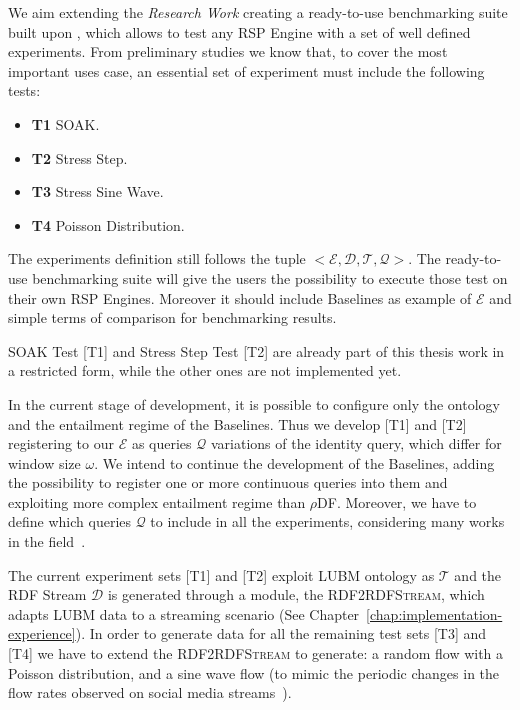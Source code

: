 \noindent We aim extending the \textit{Research Work} creating a ready-to-use benchmarking suite built upon \namens, which allows to test any RSP Engine with a set of well defined experiments. From preliminary studies we know that, to cover the most important uses case, an essential set of experiment must include the following tests:
\begin{itemize}
\item \textbf{T1} SOAK.
\item \textbf{T2} Stress Step.
\item \textbf{T3} Stress Sine Wave.
\item \textbf{T4} Poisson Distribution.
\end{itemize}

The experiments definition still follows the tuple $<\mathcal{E},\mathcal{D},\mathcal{T},\mathcal{Q}>$. The ready-to-use benchmarking suite will give the users the possibility to execute those test on their own RSP Engines. Moreover it should include \name Baselines as example of $\mathcal{E}$ and simple terms of comparison for benchmarking results.

SOAK Test [T1] and Stress Step Test [T2] are already part of this thesis work in a restricted form, while the other ones are not implemented yet. 

In the current stage of development, it is possible to configure only the ontology and the entailment regime of the Baselines. Thus we develop [T1] and [T2] registering to our $\mathcal{E}$ as queries $\mathcal{Q}$ variations of the identity query, which differ for window size $\omega$. We intend to continue the development of the Baselines, adding the possibility to register one or more continuous queries into them and exploiting more complex entailment regime than $\rho$DF. Moreover, we have to define which queries $\mathcal{Q}$ to include in all the experiments, considering many works in the field~\cite{DBLP:conf/esws/ScharrenbachUMVB13, Zhang2012, LePhuoc2012c, DBLP:conf/semweb/DellAglioCBCV13}.

The current experiment sets [T1] and [T2] exploit LUBM ontology as $\mathcal{T}$ and the RDF Stream $\mathcal{D}$ is generated through a module, the \textsc{RDF2RDFStream}, which adapts LUBM data to a streaming scenario (See Chapter~\ref{chap:implementation-experience}). In order to generate data for all the remaining test sets [T3] and [T4] we have to extend the \textsc{RDF2RDFStream} to generate: a random flow with a Poisson distribution, and a sine wave flow (to mimic the periodic changes in the flow rates observed on social media streams~\cite{DBLP:conf/semweb/BalduiniVDTPC13}).

